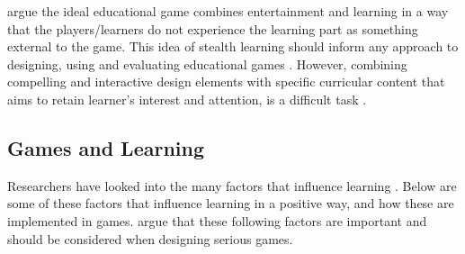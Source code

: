 \documentclass[a4paper,11.5pt]{report}
\numberwithin{figure}{section}
\numberwithin{table}{section}
\numberwithin{equation}{section}
\numberwithin{equation}{section}
\begin{document}
\citet{Breuer2010} argue the ideal educational game combines entertainment and learning in a way that the players/learners do not experience the learning part as something external to the game. This idea of stealth learning should inform any approach to designing, using and evaluating educational games \citep{Breuer2010}. However, combining compelling and interactive design elements with specific curricular content that aims to retain learner's interest and attention, is a difficult task \citep{prensky2003}. 










\subsection{Games and Learning}

Researchers have looked into the many factors that influence learning \citep{roungas2015}. Below are some of these factors that influence learning in a positive way, and how these are implemented in games. \citet{roungas2015} argue that these following factors are important and should be considered when designing serious games.
\end{document}
